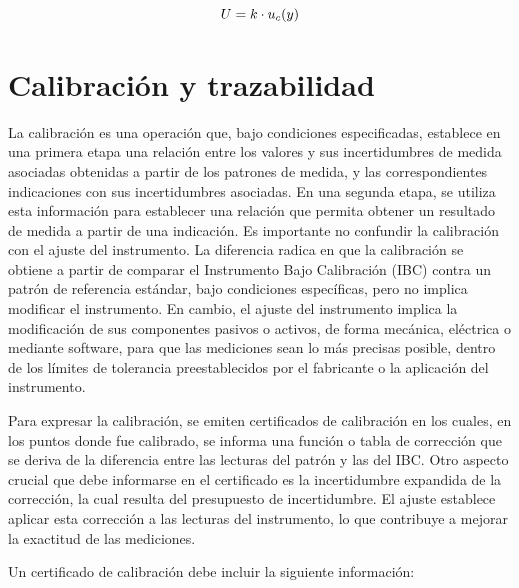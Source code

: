 \begin{equation}
    \centering
    U = k \cdot u_{c}(y)
    \label{eq:incertidumbreExpandida}
\end{equation}

\section{Calibración y trazabilidad}\label{sec:trazabilidad}

La calibración es una operación que, bajo condiciones especificadas, establece en una primera etapa una relación entre los valores y sus incertidumbres de medida asociadas obtenidas a partir de los patrones de medida, y las correspondientes indicaciones con sus incertidumbres asociadas. En una segunda etapa, se utiliza esta información para establecer una relación que permita obtener un resultado de medida a partir de una indicación. Es importante no confundir la calibración con el ajuste del instrumento. La diferencia radica en que la calibración se obtiene a partir de comparar el Instrumento Bajo Calibración (IBC) contra un patrón de referencia estándar, bajo condiciones específicas, pero no implica modificar el instrumento. En cambio, el ajuste del instrumento implica la modificación de sus componentes pasivos o activos, de forma mecánica, eléctrica o mediante software, para que las mediciones sean lo más precisas posible, dentro de los límites de tolerancia preestablecidos por el fabricante o la aplicación del instrumento.

Para expresar la calibración, se emiten certificados de calibración en los cuales, en los puntos donde fue calibrado, se informa una función o tabla de corrección que se deriva de la diferencia entre las lecturas del patrón y las del IBC. Otro aspecto crucial que debe informarse en el certificado es la incertidumbre expandida de la corrección, la cual resulta del presupuesto de incertidumbre. El ajuste establece aplicar esta corrección a las lecturas del instrumento, lo que contribuye a mejorar la exactitud de las mediciones. 

Un certificado de calibración debe incluir la siguiente información:


